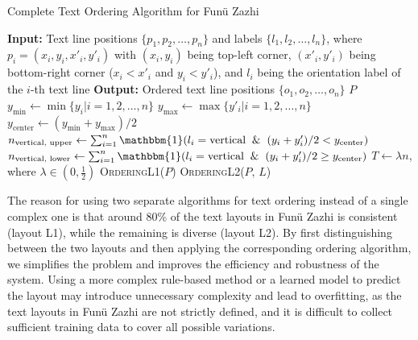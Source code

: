 \documentclass[12pt,twoside]{report}
\begin{document}
\begin{algorithm}[htbp]
    \caption{Complete Text Ordering Algorithm for Funü Zazhi}
    \begin{algorithmic}[1]
        \State \textbf{Input:} Text line positions $\{p_1, p_2, \ldots, p_n\}$ and labels $\{l_1, l_2, \ldots, l_n\}$, where $p_i = (x_i, y_i, x'_i, y'_i)$ with $(x_i, y_i)$ being top-left corner, $(x'_i, y'_i)$ being bottom-right corner ($x_i < x'_i$ and $y_i < y'_i$), and $l_i$ being the orientation label of the $i$-th text line
        \State \textbf{Output:} Ordered text line positions $\{o_1, o_2, \ldots, o_n\}$
                \State \Return $P$
            \Else
                \State $y_{\text{min}} \gets \min \{y_i | i = 1, 2, \ldots, n\}$
                \State $y_{\text{max}} \gets \max \{y'_i | i = 1, 2, \ldots, n\}$
                \State $y_{\text{center}} \gets (y_{\text{min}}+y_{\text{max}})/2$
                \State $n_{\text{vertical, upper}} \gets \sum_{i=1}^{n} \mathbbm{1}(l_i = \text{vertical} \And (y_i + y'_i)/2 < y_{\text{center}})$
                \State $n_{\text{vertical, lower}} \gets \sum_{i=1}^{n} \mathbbm{1}(l_i = \text{vertical} \And (y_i + y'_i)/2 \geq y_{\text{center}})$
                \State $ T \gets \lambda n$, where $\lambda \in (0, \frac{1}{2})$ 
                    \State \Return \textsc{OrderingL1}($P$)
                \Else
                    \State \Return \textsc{OrderingL2}($P$, $L$)
                \EndIf
            \EndIf
        \EndFunction
    \end{algorithmic}
    \label{alg:ordering}
\end{algorithm}

The reason for using two separate algorithms for text ordering instead of a single complex one is that around 80\% of the text layouts in Funü Zazhi is consistent (layout L1), while the remaining is diverse (layout L2). By first distinguishing between the two layouts and then applying the corresponding ordering algorithm, we simplifies the problem and improves the efficiency and robustness of the system. Using a more complex rule-based method or a learned model to predict the layout may introduce unnecessary complexity and lead to overfitting, as the text layouts in Funü Zazhi are not strictly defined, and it is difficult to collect sufficient training data to cover all possible variations. 
\end{document}
